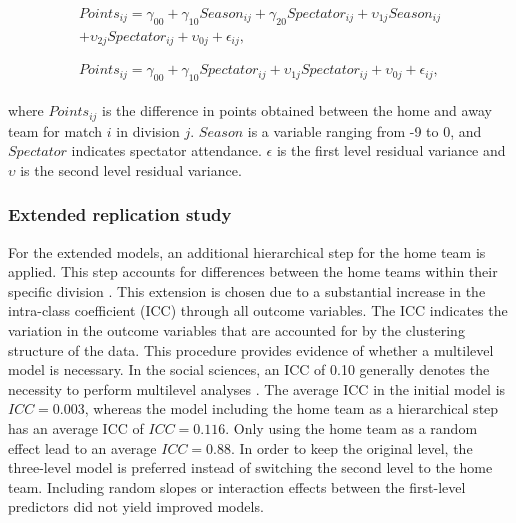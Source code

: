 \begin{align}
\begin{split}\label{eq:1}
    Points_{ij} = \gamma_{00} + \gamma_{10} Season_{ij} + \gamma_{20} Spectator_{ij} + \upsilon_{1j} Season_{ij} \\+ \upsilon_{2j} Spectator_{ij} + \upsilon_{0j} + \epsilon_{ij},
\end{split}\\
\begin{split}\label{eq:2}\\
    Points_{ij} = \gamma_{00} + \gamma_{10} Spectator_{ij} + \upsilon_{1j} Spectator_{ij} + \upsilon_{0j} + \epsilon_{ij},
\end{split}
\end{align}

\noindent
where $Points_{ij}$ is the difference in points obtained between the home and away team for match $i$ in division $j$. $Season$ is a variable ranging from -9 to 0, and $Spectator$ indicates spectator attendance. $\epsilon$ is the first level residual variance and $\upsilon$ is the second level residual variance.

\subsubsection{Extended replication study}
For the extended models, an additional hierarchical step for the home team is applied. This step accounts for differences between the home teams within their specific division \cite{mccarrick2021home}. This extension is chosen due to a substantial increase in the intra-class coefficient (ICC) through all outcome variables. The ICC indicates the variation in the outcome variables that are accounted for by the clustering structure of the data. This procedure provides evidence of whether a multilevel model is necessary. In the social sciences, an ICC of 0.10 generally denotes the necessity to perform multilevel analyses \cite{hox2017multilevel}. 
The average ICC in the initial model is $ICC=0.003$, whereas the model including the home team as a hierarchical step has an average ICC of $ICC=0.116$. Only using the home team as a random effect lead to an average $ICC=0.88$. In order to keep the original level, the three-level model is preferred instead of switching the second level to the home team. Including random slopes or interaction effects between the first-level predictors did not yield improved models.

